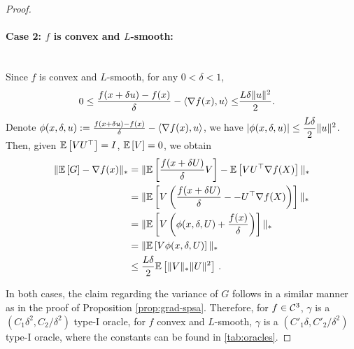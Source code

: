 \begin{proof}
\paragraph{Case 2: $f$ is convex and $L$-smooth:}\ \\
Since $f$ is convex and $L$-smooth, for any $0<\delta <1$,
\begin{align*}
 0 \le \frac{f(x + \delta u)-f(x)}{\delta}-\left\langle\nabla f(x), u\right\rangle \le&   \frac{L \delta \| u\|^2}{2}.
\end{align*}
Denote
$\phi(x,\delta,u):=\frac{f(x + \delta u)-f(x)}{\delta}-\left\langle\nabla f(x), u\right\rangle$, we have
$\left|\phi(x,\delta,u) \right| \le  \dfrac{L\delta}{2} \|u\|^2$.
Then,  given $\mathbb{E}\left[VU^\top\right]=I$, $\mathbb{E}\left[V\right]=0$, we obtain
\begin{align*}
\| \mathbb{E}\left[ G \right] - \nabla f(x) \|_*
&= \| \mathbb{E}\left[\frac{f(x + \delta U)}{\delta}V\right]-\mathbb{E}\left[VU^\top \nabla f(X)\right]  \|_*\\
&=\| \mathbb{E}\left[V\left( \frac{f(x + \delta U)}{\delta}- -U^\top \nabla f(X)\right)\right]  \|_*\\
&= \| \mathbb{E}\left[V\left( \phi(x,\delta,U)+\dfrac{f(x)}{\delta} \right)\right]  \|_*\\
&=\| \mathbb{E}\left[V\phi(x,\delta,U)\right] \|_*\\
&\le \dfrac{L\delta}{2}\mathbb{E}\left[\|V\|_*\|U\|^2\right]\,.
\end{align*}

In both cases, the claim regarding the variance of $G$ follows in a similar manner as in the proof of Proposition \ref{prop:grad-spsa}.
Therefore, for $f \in \mathcal{C}^3$, $\gamma$ is a $(C_1\delta^2, C_2/\delta^2)$ type-I oracle, for $f$ convex and $L$-smooth, $\gamma$ is a $(C'_1\delta, C'_2/\delta^2)$ type-I oracle, where the constants can be found in \cref{tab:oracles}.


\end{proof}
